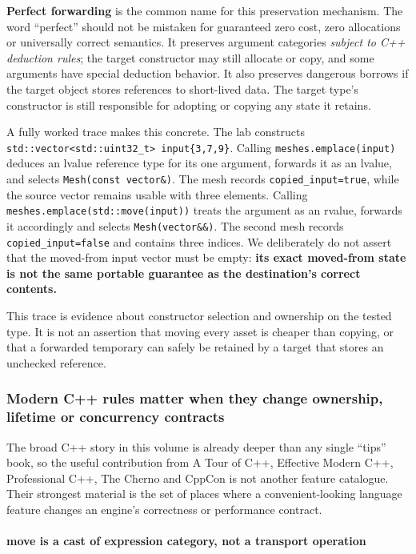 \textbf{Perfect forwarding} is the common name for this preservation mechanism. The word ``perfect'' should not be mistaken for guaranteed zero cost, zero allocations or universally correct semantics. It preserves argument categories \emph{subject to C++ deduction rules}; the target constructor may still allocate or copy, and some arguments have special deduction behavior. It also preserves dangerous borrows if the target object stores references to short-lived data. The target type's constructor is still responsible for adopting or copying any state it retains.

A fully worked trace makes this concrete. The lab constructs \texttt{std::vector\textless{}std::uint32\_t\textgreater{}\ input\{3,7,9\}}. Calling \texttt{meshes.emplace(input)} deduces an lvalue reference type for its one argument, forwards it as an lvalue, and selects \texttt{Mesh(const\ vector\&)}. The mesh records \texttt{copied\_input=true}, while the source vector remains usable with three elements. Calling \texttt{meshes.emplace(std::move(input))} treats the argument as an rvalue, forwards it accordingly and selects \texttt{Mesh(vector\&\&)}. The second mesh records \texttt{copied\_input=false} and contains three indices. We deliberately do not assert that the moved-from input vector must be empty: \textbf{its exact moved-from state is not the same portable guarantee as the destination's correct contents.}

This trace is evidence about constructor selection and ownership on the tested type. It is not an assertion that moving every asset is cheaper than copying, or that a forwarded temporary can safely be retained by a target that stores an unchecked reference.

\subsubsection{Modern C++ rules matter when they change ownership, lifetime or concurrency contracts}\label{modern-c-rules-matter-when-they-change-ownership-lifetime-or-concurrency-contracts}

The broad C++ story in this volume is already deeper than any single ``tips'' book, so the useful contribution from A Tour of C++, Effective Modern C++, Professional C++, The Cherno and CppCon is not another feature catalogue. Their strongest material is the set of places where a convenient-looking language feature changes an engine's correctness or performance contract.

\paragraph{move is a cast of expression category, not a transport operation}\label{move-is-a-cast-of-expression-category-not-a-transport-operation}

